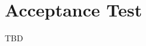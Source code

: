 \documentclass[a4paper,bibtotoc,oneside]{scrbook}
\begin{document}
%



\chapter{Acceptance Test}
TBD


%
%


\end{document}

